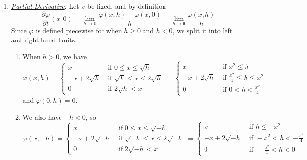 \begin{solution}
\begin{enumerate}
			\item \textit{\hyperref[def:partial-derivative]{Partial Derivative}}. Let $x$ be fixed, and by definition 
				\begin{equation}
					\frac{\partial \varphi}{\partial t} (x, 0) = \lim_{h \to 0} \frac{\varphi(x, h) - \varphi(x, 0)}{h} = \lim_{h \to 0} \frac{\varphi(x, h)}{h}
				\end{equation}
				Since $\varphi$ is defined piecewise for when $h \geq 0$ and $h < 0$, we split it into left and right hand limits. 
				\begin{enumerate} 
				  \item When $h > 0$, we have 
						\begin{equation}
							\varphi(x, h) = \begin{cases} 
								x & \text{ if } 0 \leq x \leq \sqrt{h} \\ 
								-x + 2 \sqrt{h} & \text{ if } \sqrt{h} \leq x \leq 2 \sqrt{h} \\ 
								0 & \text{ if } 2 \sqrt{h} < x 
							\end{cases} = \begin{cases} 
								x & \text{ if } x^2 \leq h \\ 
								-x + 2 \sqrt{h} & \text{ if } \frac{x^2}{4} \leq h \leq x^2 \\ 
								0 & \text{ if } 0 < h < \frac{x^2}{4}
							\end{cases}
						\end{equation}
						and $\varphi(0, h) = 0$. 

					\item We also have $-h < 0$, so 
						\begin{equation}
							\varphi(x, -h) = \begin{cases} 
								x & \text{ if } 0 \leq x \leq \sqrt{-h} \\ 
								-x + 2 \sqrt{-h} & \text{ if } \sqrt{-h} \leq x \leq 2 \sqrt{-h} \\ 
								0 & \text{ if } 2 \sqrt{-h} < x 
							\end{cases} = \begin{cases} 
								x & \text{ if } h \leq -x^2 \\ 
								-x + 2 \sqrt{-h} & \text{ if } -x^2 < h < -\frac{x^2}{4} \\ 
								0 & \text{ if } -\frac{x^2}{4} < h < 0
							\end{cases}
						\end{equation}
				\end{enumerate}


\end{enumerate}
\end{solution}
